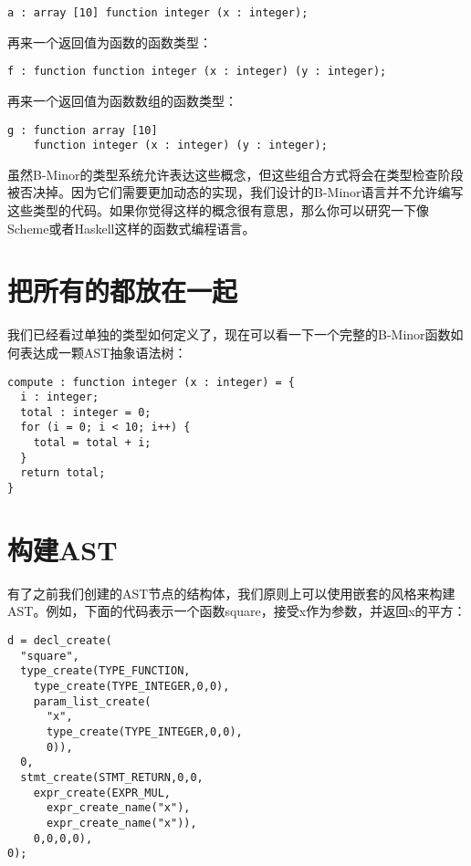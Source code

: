 \documentclass[cn,11pt,chinese]{elegantbook}
\begin{document}
\begin{verbatim}
a : array [10] function integer (x : integer);
\end{verbatim}

再来一个返回值为函数的函数类型：

\begin{verbatim}
f : function function integer (x : integer) (y : integer);
\end{verbatim}

再来一个返回值为函数数组的函数类型：

\begin{verbatim}
g : function array [10]
    function integer (x : integer) (y : integer);
\end{verbatim}

虽然B-Minor的类型系统允许表达这些概念，但这些组合方式将会在类型检查阶段被否决掉。因为它们需要更加动态的实现，我们设计的B-Minor语言并不允许编写这些类型的代码。如果你觉得这样的概念很有意思，那么你可以研究一下像Scheme或者Haskell这样的函数式编程语言。

\section{把所有的都放在一起}

我们已经看过单独的类型如何定义了，现在可以看一下一个完整的B-Minor函数如何表达成一颗AST抽象语法树：

\begin{verbatim}
compute : function integer (x : integer) = {
  i : integer;
  total : integer = 0;
  for (i = 0; i < 10; i++) {
    total = total + i;
  }
  return total;
}
\end{verbatim}

\section{构建AST}

有了之前我们创建的AST节点的结构体，我们原则上可以使用嵌套的风格来构建AST。例如，下面的代码表示一个函数square，接受x作为参数，并返回x的平方：

\begin{verbatim}
d = decl_create(
  "square",
  type_create(TYPE_FUNCTION,
    type_create(TYPE_INTEGER,0,0),
    param_list_create(
      "x",
      type_create(TYPE_INTEGER,0,0),
      0)),
  0,
  stmt_create(STMT_RETURN,0,0,
    expr_create(EXPR_MUL,
      expr_create_name("x"),
      expr_create_name("x")),
    0,0,0,0),
0);
\end{verbatim}
\end{document}
